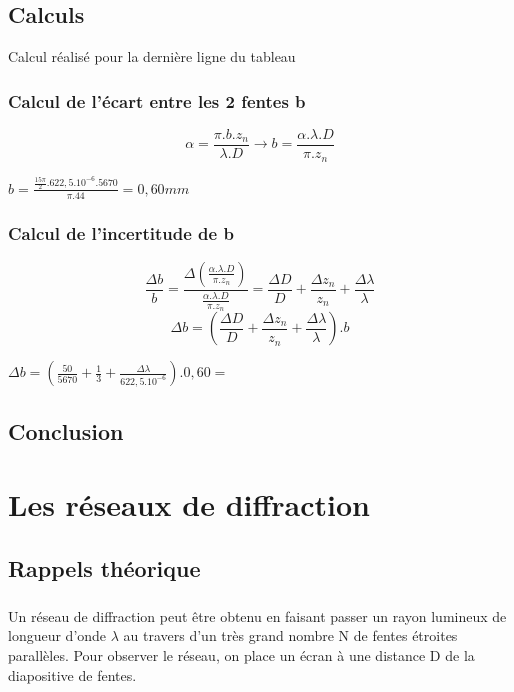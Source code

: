 \documentclass[11pt,a4paper]{report}
\begin{document}
	\section{Calculs}
		Calcul réalisé pour la dernière ligne du tableau
		\subsection{Calcul de l'écart entre les 2 fentes b}
		\begin{equation}
		\alpha = \frac{\pi.b.z_{n}}{\lambda.D} \rightarrow b = \frac{\alpha .\lambda.D }{\pi.z_{n}} 
		\end{equation}
\begin{center}$ b = \frac{\frac{15\pi}{2}.622,5.10^{-6}.5670}{\pi.44} = 0,60 mm$\end{center}
		\subsection{Calcul de l'incertitude de b}
		\begin{equation}
		\frac{\Delta b}{b} = \frac{\Delta\left(\frac{\alpha .\lambda.D }{\pi.z_{n}}\right)}{\frac{\alpha .\lambda.D }{\pi.z_{n}}} 
		= \frac{\Delta D}{D}+\frac{\Delta z_{n}}{z_{n}} + \frac{\Delta \lambda}{\lambda}
		\end{equation}
		\begin{equation}
		\Delta b
		= \left(\frac{\Delta D}{D}+\frac{\Delta z_{n}}{z_{n}} + \frac{\Delta \lambda}{\lambda}\right).b
		\end{equation}
		\begin{center}
		$\Delta b = \left(\frac{50}{5670}+\frac{1}{3} + \frac{\Delta \lambda}{622,5.10^{-6}}\right).0,60 = $
		\end{center}
	\section{Conclusion}
\chapter{Les réseaux de diffraction}
	\section{Rappels théorique}
\paragraph{}	
	Un réseau de diffraction peut être obtenu en faisant passer un rayon lumineux de longueur d'onde $\lambda$ au travers d'un très grand nombre N de fentes étroites parallèles. Pour observer le réseau, on place un écran à une distance D de la diapositive de fentes.
\end{document}
